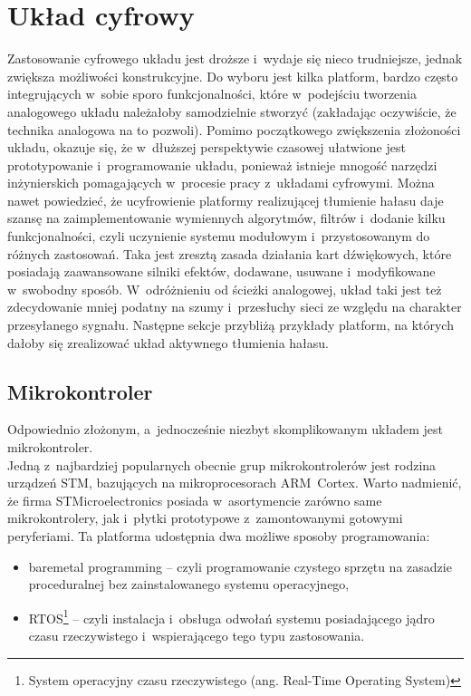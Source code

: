 \section{Układ cyfrowy}
\label{sec:digital}
Zastosowanie cyfrowego układu jest droższe i~wydaje się nieco trudniejsze, jednak zwiększa możliwości konstrukcyjne. Do wyboru jest kilka platform, bardzo często integrujących w~sobie sporo funkcjonalności, które w~podejściu tworzenia analogowego układu należałoby samodzielnie stworzyć (zakładając oczywiście, że technika analogowa na to pozwoli).  Pomimo początkowego zwiększenia złożoności układu, okazuje się, że w~dłuższej perspektywie czasowej ułatwione jest prototypowanie i~programowanie układu, ponieważ istnieje mnogość narzędzi inżynierskich pomagających w~procesie pracy z~układami cyfrowymi. Można nawet powiedzieć, że ucyfrowienie platformy realizującej tłumienie hałasu daje szansę na zaimplementowanie wymiennych algorytmów, filtrów i~dodanie kilku funkcjonalności, czyli uczynienie systemu modułowym i~przystosowanym do różnych zastosowań. Taka jest zresztą zasada działania kart dźwiękowych, które posiadają zaawansowane silniki efektów, dodawane, usuwane i~modyfikowane w~swobodny sposób.  W~odróżnieniu od ścieżki analogowej, układ taki jest też zdecydowanie mniej podatny na szumy i~przesłuchy sieci ze względu na charakter przesyłanego sygnału. Następne sekcje przybliżą przykłady platform, na których dałoby się zrealizować układ aktywnego tłumienia hałasu.
\subsection{Mikrokontroler}
\label{uC}
Odpowiednio złożonym, a~jednocześnie niezbyt skomplikowanym układem jest mikrokontroler. \\
Jedną z~najbardziej popularnych obecnie grup mikrokontrolerów jest rodzina urządzeń STM, bazujących na mikroprocesorach ARM~Cortex. Warto nadmienić, że firma STMicroelectronics posiada w~asortymencie zarówno same mikrokontrolery, jak i~płytki prototypowe z~zamontowanymi gotowymi peryferiami. Ta platforma udostępnia dwa możliwe sposoby programowania:
\begin{itemize}
	\item baremetal programming -- czyli programowanie czystego sprzętu na zasadzie proceduralnej bez zainstalowanego systemu operacyjnego,
	\item RTOS\footnote{System operacyjny czasu rzeczywistego (ang. Real-Time Operating System)} -- czyli instalacja i~obsługa odwołań systemu posiadającego jądro czasu rzeczywistego i~wspierającego tego typu zastosowania.
\end{itemize}
